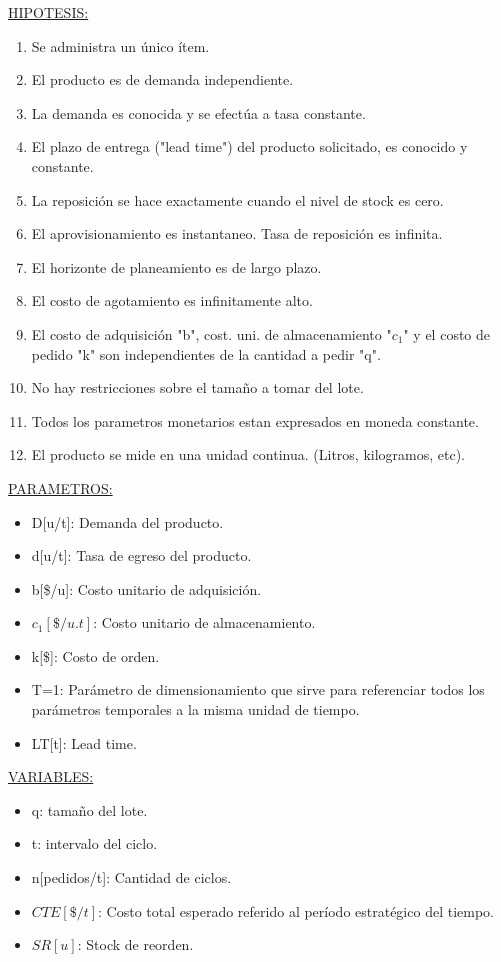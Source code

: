\documentclass{article}
\begin{document}
\noindent
\underline{HIPOTESIS:}
\begin{enumerate}
    \item Se administra un único ítem.
    \item El producto es de demanda independiente.
    \item La demanda es conocida y se efectúa a tasa constante.
    \item El plazo de entrega ("lead time") del producto solicitado, es conocido y constante.
    \item La reposición se hace exactamente cuando el nivel de stock es cero.
    \item El aprovisionamiento es instantaneo. Tasa de reposición es infinita.
    \item El horizonte de planeamiento es de largo plazo.
    \item El costo de agotamiento es infinitamente alto.
    \item El costo de adquisición "b", cost. uni. de almacenamiento "\(c_1\)" y el costo de pedido "k" son independientes de la cantidad a pedir "q".
    \item No hay restricciones sobre el tamaño a tomar del lote.
    \item Todos los parametros monetarios estan expresados en moneda constante.
    \item El producto se mide en una unidad continua. (Litros, kilogramos, etc).
\end{enumerate}

\noindent
\underline{PARAMETROS:}
\begin{itemize}
    \item D[u/t]: Demanda del producto.
    \item d[u/t]: Tasa de egreso del producto.
    \item b[\$/u]: Costo unitario de adquisición.
    \item \(c_1[\$/u.t]\):  Costo unitario de almacenamiento.
    \item k[\$]: Costo de orden.
    \item T=1: Parámetro de dimensionamiento que sirve para referenciar todos los parámetros temporales a la misma unidad de tiempo.
    \item LT[t]: Lead time.
\end{itemize}

\noindent
\underline{VARIABLES:}
\begin{itemize}
    \item q: tamaño del lote.
    \item t: intervalo del ciclo.
    \item n[pedidos/t]: Cantidad de ciclos.
    \item \(CTE[\$/t]\): Costo total esperado referido al período estratégico del tiempo.
    \item \(SR[u]\): Stock de reorden.
\end{itemize}
\end{document}
